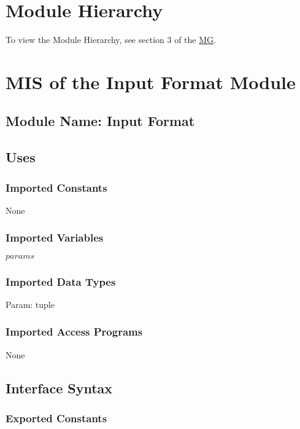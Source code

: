 \documentclass[12pt]{article}
\begin{document}
\section{Module Hierarchy} 

To view the Module Hierarchy, see section 3 of the \href{../MG/glassbr_mg.pdf}{MG}.

\section{MIS of the Input Format Module} \label{SecInF}

\subsection{Module Name: Input Format}

\subsection{Uses}

\subsubsection{Imported Constants}

None

\subsubsection{Imported Variables}

$params$

\subsubsection{Imported Data Types}

Param: tuple 

\subsubsection{Imported Access Programs}

None

\subsection{Interface Syntax}

\subsubsection{Exported Constants}
\end{document}
